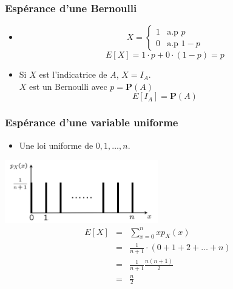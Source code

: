 \documentclass{beamer}
\begin{document}
\begin{frame}[t]
  \frametitle{Espérance d'une Bernoulli}
      \small
      \begin{itemize}
        \item
      \begin{equation*}
       X = \begin{cases}
         1 & \text{a.p  } p\\[6pt]  
         0 & \text{a.p  } 1 - p
       \end{cases}
      \end{equation*}
      \vspace*{.5cm}
      \pause
       \begin{equation*}
         E[X] = 1\cdot p + 0\cdot (1-p) = p
       \end{equation*}
       \pause
     \item Si $X$ est l'indicatrice de $A$, \alert{\textbf{$X = I_A$}}.\\[.5cm]
        \pause
        $X$ est un Bernoulli avec $p = \mathbf{P}(A)$
        \begin{equation*}
          E[I_A] = \mathbf{P}(A)
        \end{equation*}
   \end{itemize}
\end{frame}

\begin{frame}[t]
  \frametitle{Espérance d'une variable uniforme}
  
  \begin{itemize}
    \item Une loi uniforme de $0,1,\ldots, n$.\\[12pt]
  \end{itemize}
  \pause
    \centering
    \small
    \includegraphics[width=0.5\textwidth]{./uniform_0_n.png}
    \pause
    \begin{eqnarray*}
      E[X] & = & \sum_{x=0}^n x p_X(x)\\
           & = & \frac{1}{n+1}\cdot (0 + 1 + 2 + \ldots + n)\\
           & = & \frac{1}{n+1}\frac{n(n+1)}{2}\\
           & = & \frac{n}{2}
    \end{eqnarray*}
\end{frame}
\end{document}
